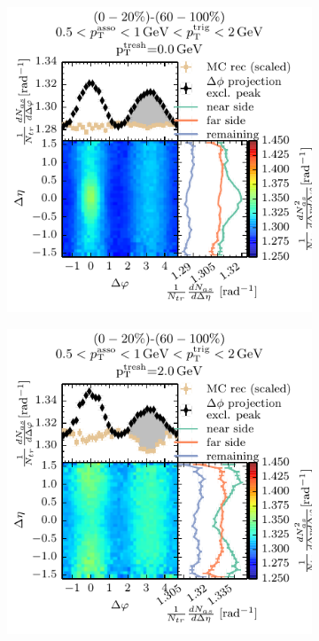 \begin{figure}
  \centering
  \begin{subfigure}[b]{0.5\textwidth}
    \includegraphics[]{figures/05_12_sub_thresh_00.pdf}
  \end{subfigure}%
  \begin{subfigure}[b]{0.5\textwidth}
    \includegraphics[]{figures/05_12_sub_thresh_20.pdf}
  \end{subfigure}

\end{figure}

